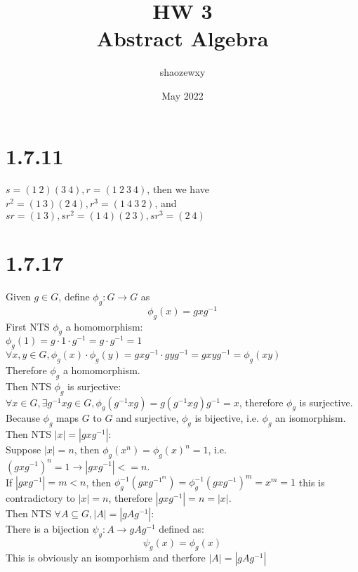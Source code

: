 \documentclass{article}
\title{HW 3\\
\large{Abstract Algebra}}
\author{shaozewxy }
\date{May 2022}
\begin{document}
\maketitle
\setcounter{secnumdepth}{0}
\section{1.7.11}
$s = (1\ 2) (3\ 4), r = (1\ 2\ 3\ 4)$, then we have\\
$r^2 = (1\ 3)(2\ 4), r^3 = (1\ 4\ 3\ 2)$, and\\
$sr = (1\ 3), sr^2 = (1\ 4)(2\ 3), sr^3 = (2\ 4)$
\section{1.7.17}
Given $g \in G$, define $\phi_g: G \rightarrow G$ as
\begin{equation*}
    \phi_g(x) = gxg^{-1}
\end{equation*}
First NTS $\phi_g$ a homomorphism:\\
$\phi_g(1) = g\cdot 1\cdot g^{-1} = g \cdot g^{-1} = 1$\\
$\forall x, y \in G, \phi_g(x) \cdot \phi_g(y) = gxg^{-1} \cdot gyg^{-1} = gxyg^{-1} = \phi_g(xy)$\\
Therefore $\phi_g$ a homomorphism.\\
Then NTS $\phi_g$ is surjective:\\
$\forall x \in G, \exists g^{-1}xg \in G, \phi_g(g^{-1}xg) = g(g^{-1}xg)g^{-1} = x$, therefore $\phi_g$ is surjective.\\
Because $\phi_g$ maps $G$ to $G$ and surjective, $\phi_g$ is bijective, i.e. $\phi_g$ an isomorphism.\\
Then NTS $|x| = |gxg^{-1}|$:\\
Suppose $|x| = n$, then $\phi_g(x^n) = \phi_g(x)^n = 1$, i.e. $(gxg^{-1})^n = 1 \rightarrow |gxg^{-1}| <= n$.\\
If $|gxg^{-1}| = m < n$, then $\phi_g^{-1}(gxg^{-1}^m) = \phi_g^{-1}(gxg^{-1})^m = x^m = 1$ this is contradictory to $|x| = n$, therefore $|gxg^{-1}| = n = |x|$.\\
Then NTS $\forall A \subseteq G, |A| = |gAg^{-1}|$:\\
There is a bijection $\psi_g: A \rightarrow gAg^{-1}$ defined as:
\begin{equation*}
    \psi_g(x) = \phi_g(x)
\end{equation*}
This is obviously an isomporhism and therfore $|A| = |gAg^{-1}|$
\end{document}
